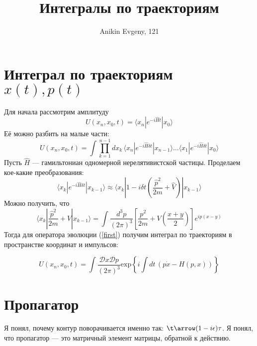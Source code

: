 \documentclass{article}
\title{Интегралы по траекториям}
\author{Anikin Evgeny, 121}
\newcommand{\bra}{\langle}
\newcommand{\ket}{\rangle}
\begin{document}
\maketitle
\section{Интеграл по траекториям $x(t), p(t)$}
Для начала рассмотрим амплитуду 
\begin{equation}
U(x_n, x_0, t) = \bra x_n | e^{-i\hat{H}t} | x_0 \ket
\end{equation}
Её можно разбить на малые части:
\begin{equation}
\label{first}
U(x_n, x_0, t) = \int \prod_{k = 1}^{ n-1} dx_k\,
			\bra x_n | e^{-i\hat{H}\delta t} | x_{n-1} \ket
			\dots
			\bra x_1 | e^{-i\hat{H}\delta t} | x_{0} \ket
\end{equation}
Пусть $\hat{H}$ --- гамильтониан одномерной нерелятивистской частицы. 
Проделаем
кое-какие преобразования:
\begin{equation}
\bra x_k | e^{-i\hat{H}\delta t} | x_{k-1} \ket \approx
	\bra x_k | 1 - i\delta t\left(\frac{\hat{p}^2}{2m}
		+ \hat{V} \right) | x_{k-1} \ket
\end{equation}
Можно получить, что
\begin{equation}
\bra x_k | \frac{\hat{p}^2}{2m} + \hat{V} | x_{k-1} \ket = 
	\int \frac{d^3p}{(2\pi)^3}\left[ \frac{p^2}{2m} 
				+ V\left(\frac{x+y}{2}\right) \right]
				e^{ip(x-y)}
\end{equation} 
Тогда для оператора эволюции (\ref{first}) получим интеграл по траекториям
в пространстве координат и импульсов:

\begin{equation}
U(x_n, x_0, t) = \int \frac{\mathcal{D}x \mathcal{D}p}{(2\pi)^3}
				\mathrm{exp}\left\{
						i\int dt\, (p\dot{x} - H(p,x))
						\right\}
\end{equation}
\section{Пропагатор}
Я понял, почему контур поворачивается именно так:
$\t \arrow (1 - i\epsilon)\tau$.  Я понял, что пропагатор --- это матричный
элемент матрицы, обратной к действию.
\end{document}
